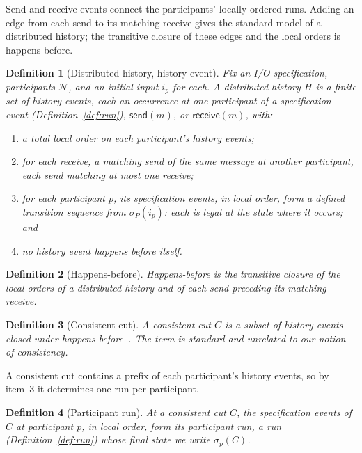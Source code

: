 \documentclass[sigconf]{cidr-2027}
\newtheorem{definition}{Definition}
\theoremstyle{remark}
\newcommand{\spectype}[1][]{I/O specification#1\xspace}
\begin{document}
\textcolor{reviewed}{Send and receive events connect the participants' locally ordered runs.} \textcolor{reviewed}{Adding
an edge from each send to its matching receive gives the standard model of a
distributed history; the transitive closure of these edges and the local orders
is happens-before.}

\begin{definition}[Distributed history, history event]
\label{def:distributed-history}
Fix an \spectype, participants $\mathcal N$, and an initial input $i_p$
for each. \textcolor{reviewed}{A \emph{distributed history} $H$ is a finite set of
\emph{history events}, each an occurrence at one participant of a
specification event (Definition~\ref{def:run}), $\mathsf{send}(m)$, or
$\mathsf{receive}(m)$, with:}
\begin{enumerate}
\item
a total local order on each participant's history events;
\item
for each receive, a matching send of the same message at another
        participant, each send matching at most one receive;
\item
for each participant $p$, its specification events, in local order,
        form a defined transition sequence from $\sigma_P(i_p)$: each
        is legal at the state where it occurs; and
\item
no history event happens before itself.
\end{enumerate}
\end{definition}

\begin{definition}[Happens-before]
\label{def:happens-before}
\emph{Happens-before} is the transitive closure of the local orders of a
distributed history and of each send preceding its matching receive.
\end{definition}

\begin{definition}[Consistent cut]
\label{def:consistent-cut}
A \emph{consistent cut} $C$ is a subset of history events closed under happens-before~\cite{lamport1978time,chandy1985distributed}. \textcolor{reviewed}{The term is standard and unrelated to our notion of consistency.}
\end{definition}

A consistent cut contains a prefix of each participant's history events, so by
item~3
it determines one run per participant.

\begin{definition}[Participant run]
\label{def:participant-run}
At a consistent cut $C$, the specification events of $C$ at participant $p$,
in local order, form its \emph{participant run}, a run
(Definition~\ref{def:run}) whose final state we write $\sigma_p(C)$.
\end{definition}
\end{document}
